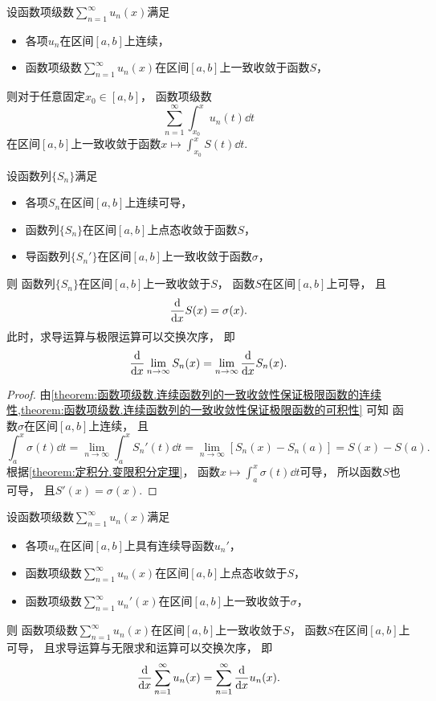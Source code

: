 \begin{proposition}
设函数项级数\(\sum_{n=1}^\infty u_n(x)\)满足\begin{itemize}
	\item 各项\(u_n\)在区间\([a,b]\)上连续，
	\item 函数项级数\(\sum_{n=1}^\infty u_n(x)\)在区间\([a,b]\)上一致收敛于函数\(S\)，
\end{itemize}
则对于任意固定\(x_0\in[a,b]\)，
函数项级数\[
	\sum_{n=1}^\infty \int_{x_0}^x u_n(t) \dd{t}
\]在区间\([a,b]\)上一致收敛于函数\(x \mapsto \int_{x_0}^x S(t) \dd{t}\).
\end{proposition}

\begin{theorem}\label{theorem:无穷级数.一致收敛级数的基本性质4}
设函数列\(\{S_n\}\)满足\begin{itemize}
	\item 各项\(S_n\)在区间\([a,b]\)上连续可导，
	\item 函数列\(\{S_n\}\)在区间\([a,b]\)上点态收敛于函数\(S\)，
	\item 导函数列\(\{S_n'\}\)在区间\([a,b]\)上一致收敛于函数\(\sigma\)，
\end{itemize}
则
函数列\(\{S_n\}\)在区间\([a,b]\)上一致收敛于\(S\)，
函数\(S\)在区间\([a,b]\)上可导，
且\[
	\dv{x} S(x) = \sigma(x).
\]
此时，求导运算与极限运算可以交换次序，
即\[
	\dv{x} \lim_{n\to\infty} S_n(x)
	= \lim_{n\to\infty} \dv{x} S_n(x).
\]
\begin{proof}
由\cref{theorem:函数项级数.连续函数列的一致收敛性保证极限函数的连续性,theorem:函数项级数.连续函数列的一致收敛性保证极限函数的可积性} 可知
函数\(\sigma\)在区间\([a,b]\)上连续，
且\[
	\int_a^x \sigma(t) \dd{t}
	= \lim_{n\to\infty} \int_a^x S_n'(t) \dd{t}
	= \lim_{n\to\infty} [S_n(x) - S_n(a)]
	= S(x) - S(a).
\]
根据\cref{theorem:定积分.变限积分定理}，
函数\(x \mapsto \int_a^x \sigma(t) \dd{t}\)可导，
所以函数\(S\)也可导，
且\(S'(x) = \sigma(x)\).
\end{proof}
\end{theorem}
\begin{theorem}
设函数项级数\(\sum_{n=1}^\infty u_n(x)\)满足\begin{itemize}
	\item 各项\(u_n\)在区间\([a,b]\)上具有连续导函数\(u_n'\)，
	\item 函数项级数\(\sum_{n=1}^\infty u_n(x)\)在区间\([a,b]\)上点态收敛于\(S\)，
	\item 函数项级数\(\sum_{n=1}^\infty u_n'(x)\)在区间\([a,b]\)上一致收敛于\(\sigma\)，
\end{itemize}
则
函数项级数\(\sum_{n=1}^\infty u_n(x)\)在区间\([a,b]\)上一致收敛于\(S\)，
函数\(S\)在区间\([a,b]\)上可导，
且求导运算与无限求和运算可以交换次序，
即\[
	\dv{x} \sum_{n=1}^\infty u_n(x)
	= \sum_{n=1}^\infty \dv{x} u_n(x).
\]
\end{theorem}
